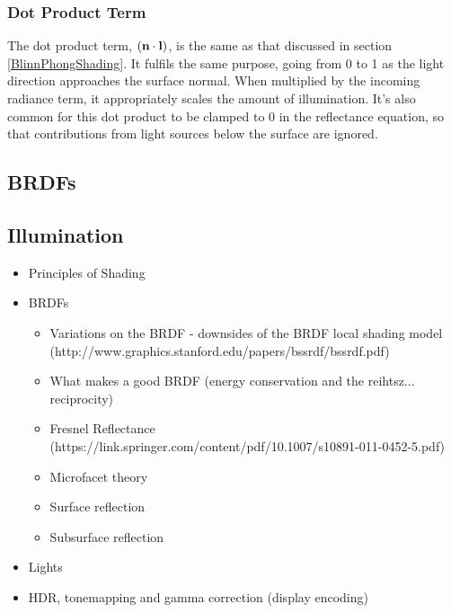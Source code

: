 \subsubsection{Dot Product Term}

The dot product term, \begin{math}(\mathbf{n}\cdot\mathbf{l})\end{math}, is the same as that discussed in section \ref{BlinnPhongShading}. It fulfils the same purpose, going from 0 to 1 as the light direction approaches the surface normal. When multiplied by the incoming radiance term, it appropriately scales the amount of illumination. It's also common for this dot product to be clamped to 0 in the reflectance equation, so that contributions from light sources below the surface are ignored.

\subsection{BRDFs} \label{BRDFs}

\subsection{Illumination} \label{Illumination}

\begin{itemize}
	\item Principles of Shading
	\item BRDFs
	\begin{itemize}
		\item Variations on the BRDF - downsides of the BRDF local shading model (http://www.graphics.stanford.edu/papers/bssrdf/bssrdf.pdf)
		\item What makes a good BRDF (energy conservation and the reihtsz... reciprocity)
		\item Fresnel Reflectance (https://link.springer.com/content/pdf/10.1007/s10891-011-0452-5.pdf)
		\item Microfacet theory
		\item Surface reflection
		\item Subsurface reflection
	\end{itemize}
	\item Lights
	\item HDR, tonemapping and gamma correction (display encoding)
\end{itemize}

